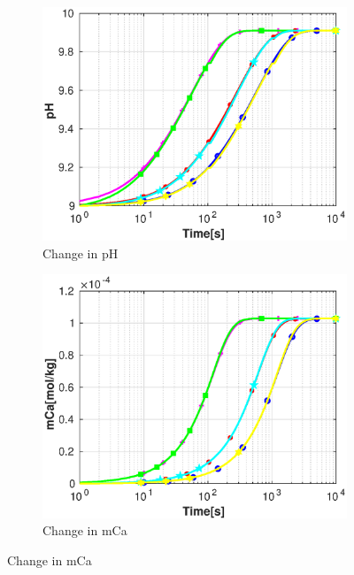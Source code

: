 \begin{figure}
   \centering
   \begin{subfigure}{.5\linewidth}
            \centering
        \includegraphics[width=\textwidth]{PICTURES/dvm_pH9_pH.eps}
        \caption{\small Change in pH}
        \label{fig:dvmpH9pH}
    \end{subfigure}%
        \hfill
    \begin{subfigure}{.5\linewidth}
            \centering
        \includegraphics[width=\textwidth]{PICTURES/dvm_pH9_mCa.eps}
        \caption{\small Change in mCa}
        \label{fig:dvmpH9mCa}
    \end{subfigure}%

\end{figure}
